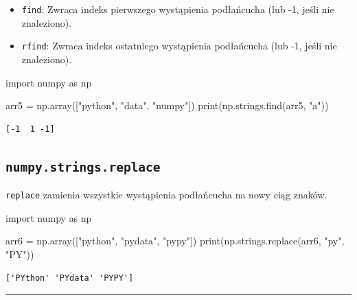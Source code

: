 \documentclass[
  polish,
  letterpaper,
  DIV=11,
  numbers=noendperiod]{scrreprt}
\newenvironment{Shaded}{\begin{snugshade}}{\end{snugshade}}
\newcommand{\BuiltInTok}[1]{\textcolor[rgb]{0.00,0.23,0.31}{#1}}
\newcommand{\ImportTok}[1]{\textcolor[rgb]{0.00,0.46,0.62}{#1}}
\newcommand{\NormalTok}[1]{\textcolor[rgb]{0.00,0.23,0.31}{#1}}
\newcommand{\OperatorTok}[1]{\textcolor[rgb]{0.37,0.37,0.37}{#1}}
\newcommand{\StringTok}[1]{\textcolor[rgb]{0.13,0.47,0.30}{#1}}
\providecommand{\tightlist}{%
  \setlength{\itemsep}{0pt}\setlength{\parskip}{0pt}}
\begin{document}
\begin{itemize}
\tightlist
\item
  \texttt{find}: Zwraca indeks pierwszego wystąpienia podłańcucha (lub
  -1, jeśli nie znaleziono).
\item
  \texttt{rfind}: Zwraca indeks ostatniego wystąpienia podłańcucha (lub
  -1, jeśli nie znaleziono).
\end{itemize}

\begin{Shaded}
\begin{Highlighting}[]
\ImportTok{import}\NormalTok{ numpy }\ImportTok{as}\NormalTok{ np}

\NormalTok{arr5 }\OperatorTok{=}\NormalTok{ np.array([}\StringTok{"python"}\NormalTok{, }\StringTok{"data"}\NormalTok{, }\StringTok{"numpy"}\NormalTok{])}
\BuiltInTok{print}\NormalTok{(np.strings.find(arr5, }\StringTok{"a"}\NormalTok{))}
\end{Highlighting}
\end{Shaded}

\begin{verbatim}
[-1  1 -1]
\end{verbatim}

\subsection{\texorpdfstring{\texttt{numpy.strings.replace}}{numpy.strings.replace}}\label{numpy.strings.replace}

\texttt{replace} zamienia wszystkie wystąpienia podłańcucha na nowy ciąg
znaków.

\begin{Shaded}
\begin{Highlighting}[]
\ImportTok{import}\NormalTok{ numpy }\ImportTok{as}\NormalTok{ np}

\NormalTok{arr6 }\OperatorTok{=}\NormalTok{ np.array([}\StringTok{"python"}\NormalTok{, }\StringTok{"pydata"}\NormalTok{, }\StringTok{"pypy"}\NormalTok{])}
\BuiltInTok{print}\NormalTok{(np.strings.replace(arr6, }\StringTok{"py"}\NormalTok{, }\StringTok{"PY"}\NormalTok{))}
\end{Highlighting}
\end{Shaded}

\begin{verbatim}
['PYthon' 'PYdata' 'PYPY']
\end{verbatim}

\begin{center}\rule{0.5\linewidth}{0.5pt}\end{center}
\end{document}
